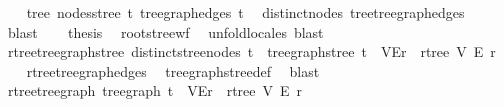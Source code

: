 \begin{isabellebody}
%
\isadelimproof
%
\endisadelimproof
%
\isatagproof
{}\isamarkupfalse%
{\isacharminus}{\kern0pt}\isanewline
\ \ \isamarkupfalse%
\ tree\ {\isachardoublequoteopen}nodes{\isacharunderscore}{\kern0pt}stree\ t{\isachardoublequoteclose}\ {\isachardoublequoteopen}tree{\isacharunderscore}{\kern0pt}graph{\isacharunderscore}{\kern0pt}edges\ t{\isachardoublequoteclose}\ \isamarkupfalse%
\ distinct{\isacharunderscore}{\kern0pt}nodes\ tree{\isacharunderscore}{\kern0pt}tree{\isacharunderscore}{\kern0pt}graph{\isacharunderscore}{\kern0pt}edges\ \isamarkupfalse%
\ blast\isanewline
\ \ \isamarkupfalse%
\ {\isacharquery}{\kern0pt}thesis\ \isamarkupfalse%
\ root{\isacharunderscore}{\kern0pt}stree{\isacharunderscore}{\kern0pt}wf\ \isamarkupfalse%
\ unfold{\isacharunderscore}{\kern0pt}locales\ blast\isanewline
{}\isamarkupfalse%
%
\endisatagproof
{\isafoldproof}%
%
\isadelimproof
\isanewline
%
\endisadelimproof
\isanewline
{}\isamarkupfalse%
\ rtree{\isacharunderscore}{\kern0pt}tree{\isacharunderscore}{\kern0pt}graph{\isacharunderscore}{\kern0pt}stree{\isacharcolon}{\kern0pt}\ {\isachardoublequoteopen}distinct{\isacharunderscore}{\kern0pt}stree{\isacharunderscore}{\kern0pt}nodes\ t\ {\isasymLongrightarrow}\ tree{\isacharunderscore}{\kern0pt}graph{\isacharunderscore}{\kern0pt}stree\ t\ {\isacharequal}{\kern0pt}\ {\isacharparenleft}{\kern0pt}V{\isacharcomma}{\kern0pt}E{\isacharcomma}{\kern0pt}r{\isacharparenright}{\kern0pt}\ {\isasymLongrightarrow}\ rtree\ V\ E\ r{\isachardoublequoteclose}\isanewline
%
\isadelimproof
\ \ %
\endisadelimproof
%
\isatagproof
{}\isamarkupfalse%
\ rtree{\isacharunderscore}{\kern0pt}tree{\isacharunderscore}{\kern0pt}graph{\isacharunderscore}{\kern0pt}edges\ \isamarkupfalse%
\ tree{\isacharunderscore}{\kern0pt}graph{\isacharunderscore}{\kern0pt}stree{\isacharunderscore}{\kern0pt}def\ \isamarkupfalse%
\ blast%
\endisatagproof
{\isafoldproof}%
%
\isadelimproof
\isanewline
%
\endisadelimproof
\isanewline
{}\isamarkupfalse%
\ rtree{\isacharunderscore}{\kern0pt}tree{\isacharunderscore}{\kern0pt}graph{\isacharcolon}{\kern0pt}\ {\isachardoublequoteopen}tree{\isacharunderscore}{\kern0pt}graph\ t\ {\isacharequal}{\kern0pt}\ {\isacharparenleft}{\kern0pt}V{\isacharcomma}{\kern0pt}E{\isacharcomma}{\kern0pt}r{\isacharparenright}{\kern0pt}\ {\isasymLongrightarrow}\ rtree\ V\ E\ r{\isachardoublequoteclose}\isanewline
%
\isadelimproof
\ \ %
\endisadelimproof

\end{isabellebody}
